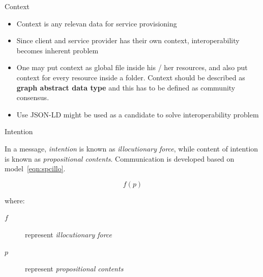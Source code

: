 \documentclass[10pt]{beamer}
\begin{document}
    \begin{frame}[fragile]{Context}
      \begin{itemize}
        \item Context is any relevan data for service provisioning
        \item Since client and service provider has their own context, interoperability becomes inherent problem
        \item One may put context as global file inside his / her resources, and also put context for every resource inside a folder. Context should be described as \textbf{graph abstract data type} and this has to be defined as community consensus. 
        \item Use JSON-LD might be used as a candidate to solve interoperability problem
      \end{itemize}
    \end{frame}

    \begin{frame}[fragile]{Intention}

In a message, \textit{intention} is known as \textit{illocutionary force}, while content of intention is known as \textit{propositional contents}. Communication is developed based on model~\ref{eqn:spcillo}.

\begin{equation}\label{eqn:spcillo}
  \boxed{f(p)}
\end{equation}

where:

\begin{description}
  \item[$f$] represent \textit{illocutionary force}
  \item[$p$] represent \textit{propositional contents}
\end{description}

    \end{frame}
\end{document}
